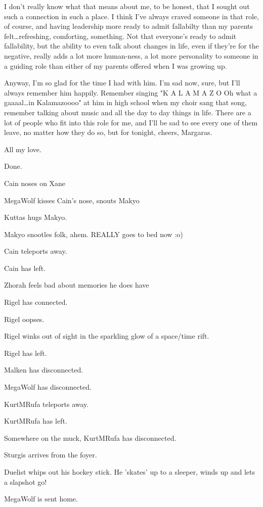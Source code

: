 I don't really know what that means about me, to be honest, that I sought out such a connection in such a place.  I think I've always craved someone in that role, of course, and having leadership more ready to admit fallabilty than my parents felt\ldots{}refreshing, comforting, something.  Not that everyone's ready to admit fallability, but the ability to even talk about changes in life, even if they're for the negative, really adds a lot more human-ness, a lot more personality to someone in a guiding role than either of my parents offered when I was growing up.

Anyway, I'm so glad for the time I had with him.  I'm sad now, sure, but I'll always remember him happily.  Remember singing "K A L A M A Z O Oh what a gaaaal\ldots{}in Kalamazoooo" at him in high school when my choir sang that song, remember talking about music and all the day to day things in life.  There are a lot of people who fit into this role for me, and I'll be sad to see every one of them leave, no matter how they do so, but for tonight, cheers, Margaras.

All my love.

\noindent Done.

Cain noses on Xane

MegaWolf kisses Cain's nose, snouts Makyo

Kuttas hugs Makyo.

Makyo snootles folk, ahem.  REALLY goes to bed now :o)

Cain teleports away.

Cain has left.

Zhorah feels bad about memories he does have

Rigel has connected.

Rigel oopses.

Rigel winks out of sight in the sparkling glow of a space/time rift.

Rigel has left.

Malken has disconnected.

MegaWolf has disconnected.

KurtMRufa teleports away.

KurtMRufa has left.

Somewhere on the muck, KurtMRufa has disconnected.

Sturgis arrives from the foyer.

Duelist whips out his hockey stick. He 'skates' up to a sleeper, winds up and lets a slapshot go!

MegaWolf is sent home.

